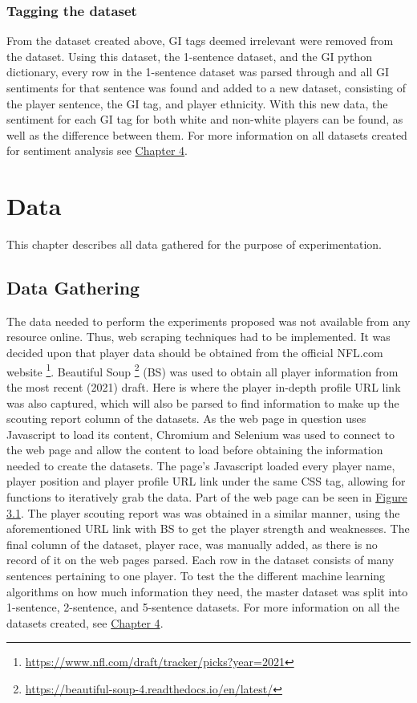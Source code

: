 \documentclass[oneside,12pt]{Classes/RoboticsLaTeX}
\begin{document}
\subsection{Tagging the dataset}
From the dataset created above, GI tags deemed irrelevant were removed from the dataset. Using this dataset, the 1-sentence dataset, and the GI python dictionary, every row in the 1-sentence dataset was parsed through and all GI 
sentiments for that sentence was found and added to a new dataset, consisting of the player sentence, the GI tag, and player ethnicity. With this new data, the sentiment for each GI tag for both white and non-white players can be found,
as well as the difference between them. For more information on all datasets created for sentiment analysis see \hyperref[sec:senti_data]{Chapter 4}.

\chapter{Data}
\label{chap:data}
This chapter describes all data gathered for the purpose of experimentation.

\section{Data Gathering}
The data needed to perform the experiments proposed was not available from any resource online. Thus, web scraping techniques had to be implemented. It was decided upon that player data should
be obtained from the official NFL.com website \footnote{\url{https://www.nfl.com/draft/tracker/picks?year=2021}}. Beautiful Soup \footnote{\url{https://beautiful-soup-4.readthedocs.io/en/latest/}} (BS)
was used to obtain all player information from the most recent (2021) draft. Here is where the player in-depth profile URL link was also captured, which will also be parsed to find information to
make up the scouting report column of the datasets. As the web page in question uses Javascript to load its content, Chromium and Selenium was used to connect to the web page and allow the content to load before obtaining the information
needed to create the datasets. The page's Javascript loaded every player name, player position and player profile URL link under the same CSS tag, allowing for functions to iteratively grab the data. Part of the web page
can be seen in \hyperref[fig:NFL_draft]{Figure 3.1}.
The player scouting report was was obtained in a similar manner, using the aforementioned URL link with BS to get the player strength and weaknesses. The final column of the dataset, player race, 
was manually added, as there is no record of it on the web pages parsed. Each row in the dataset consists of many sentences pertaining to one player. To test the the different machine learning algorithms 
on how much information they need, the master dataset was split into 1-sentence, 2-sentence, and 5-sentence datasets. For more information on all the datasets created, see \hyperref[sec:class_data]{Chapter 4}.
\end{document}
